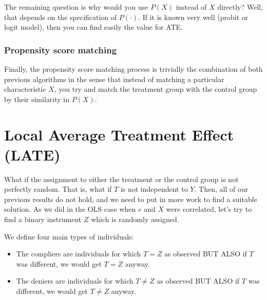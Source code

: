 The remaining question is why would you use $P(X)$ instead of $X$ directly? Well, that depends on the specification of $P(\cdot)$. If it is known very well (probit or logit model), then you can find easily the value for ATE.

\subsubsection{Propensity score matching}

Finally, the propensity score matching process is trivially the combination of both previous algorithms in the sense that instead of matching a particular characteristic $X$, you try and match the treatment group with the control group by their similarity in $P(X)$.

\section{Local Average Treatment Effect (LATE)}

What if the assignment to either the treatment or the control group is not perfectly random. That is, what if $T$ is not independent to $Y$. Then, all of our previous results do not hold, and we need to put in more work to find a suitable solution. As we did in the OLS case when $e$ and $X$ were correlated, let's try to find a binary instrument $Z$ which is randomly assigned.

We define four main types of individuals: \begin{itemize}
\item The compliers are individuals for which $T = Z$ as observed BUT ALSO if $T$ was different, we would get $T=Z$ anyway.
\item The deniers are individuals for which $T \neq Z$ as observed BUT ALSO if $T$ was different, we would get $T\neq Z$ anyway.
\end{itemize}